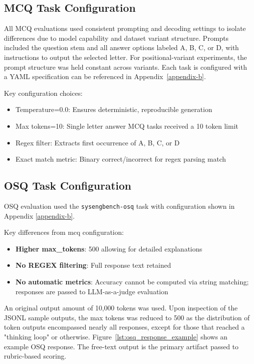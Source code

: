 \subsection{MCQ Task Configuration}
\label{subsec:ch3_obj3_mcq_config}

All MCQ evaluations used consistent prompting and decoding settings to isolate differences due to model capability and dataset variant structure. Prompts included the question stem and all answer options labeled A, B, C, or D, with instructions to output the selected letter. For positional-variant experiments, the prompt structure was held constant across variants. Each task is configured with a YAML specification can be referenced in Appendix~\ref{appendix-b}.

Key configuration choices:
\begin{itemize}
    \item Temperature=0.0: Ensures deterministic, reproducible generation
    \item Max tokens=10: Single letter answer MCQ tasks received a 10 token limit
    \item Regex filter: Extracts first occurrence of A, B, C, or D
    \item Exact match metric: Binary correct/incorrect for regex parsing match
\end{itemize}



\subsection{OSQ Task Configuration}
\label{subsec:ch3_obj3_osq_config}

OSQ evaluation used the \texttt{sysengbench-osq} task with configuration shown in Appendix \ref{appendix-b}.

Key differences from \ac{mcq} configuration:
\begin{itemize}
    \item \textbf{Higher max\_tokens}: 500 allowing for detailed explanations
    \item \textbf{No REGEX filtering}: Full response text retained
    \item \textbf{No automatic metrics}: Accuracy cannot be computed via string matching; responses are passed to  LLM-as-a-judge evaluation
\end{itemize}

An original output amount of 10,000 tokens was used. Upon inspection of the JSONL sample outputs, the max tokens was reduced to 500 as the distribution of token outputs encompassed nearly all responses, except for those that reached a "thinking loop" or otherwise. Figure~\ref{lst:osq_response_example} shows an example OSQ response. The free-text output is the primary artifact passed to rubric-based scoring.

